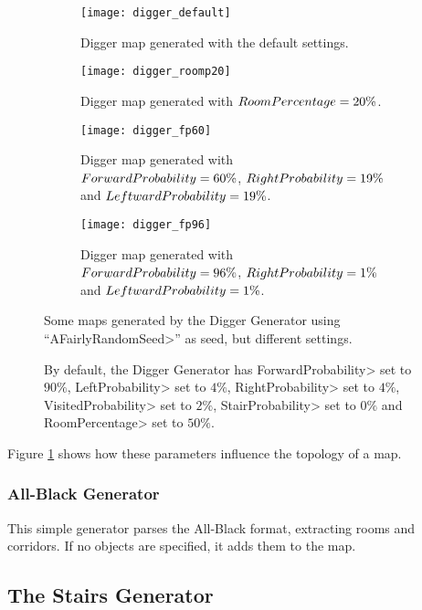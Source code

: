 \begin{figure}[tp]
\centering
\begin{subfigure}[t]{0.48\linewidth}
\texttt{[image: digger\_default]}
\caption{Digger map generated with the default settings.}
\end{subfigure}
\begin{subfigure}[t]{0.48\linewidth}
\texttt{[image: digger\_roomp20]}
\caption{Digger map generated with $Room\-Per\-cent\-age = 20\%$.}
\end{subfigure}
\begin{subfigure}[t]{0.48\linewidth}
\texttt{[image: digger\_fp60]}
\caption{Digger map generated with $For\-ward\-Prob\-a\-bil\-i\-ty = 60\%$, $Right\-Prob\-a\-bil\-i\-ty = 19\%$ and $Left\-ward\-Prob\-a\-bil\-i\-ty = 19\%$.}
\end{subfigure}
\begin{subfigure}[t]{0.48\linewidth}
\texttt{[image: digger\_fp96]}
\caption{Digger map generated with $For\-ward\-Prob\-a\-bil\-i\-ty = 96\%$, $Right\-Prob\-a\-bil\-i\-ty = 1\%$ and $Left\-ward\-Prob\-a\-bil\-i\-ty = 1\%$.}
\end{subfigure}
\caption{Some maps generated by the Digger Generator using ``\<AFairlyRandomSeed>'' as seed, but different settings.}
\caption*{By default, the Digger Generator has \<For\-ward\-Prob\-a\-bil\-i\-ty> set to $90\%$, \<Left\-Prob\-a\-bil\-i\-ty> set to $4\%$, \<Right\-Prob\-a\-bil\-i\-ty> set to $4\%$, \<Vis\-it\-ed\-Prob\-a\-bil\-i\-ty> set to $2\%$, \<Stair\-Prob\-a\-bil\-i\-ty> set to $0\%$ and \<Room\-Per\-cent\-age> set to $50\%$.}
\label{fig:diggers}
\end{figure}

Figure \ref{fig:diggers} shows how these parameters influence the topology of a map.


\subsubsection{All-Black Generator}

This simple generator parses the All-Black format, extracting rooms and corridors. If no objects are specified, it adds them to the map.


\subsection{The Stairs Generator}

